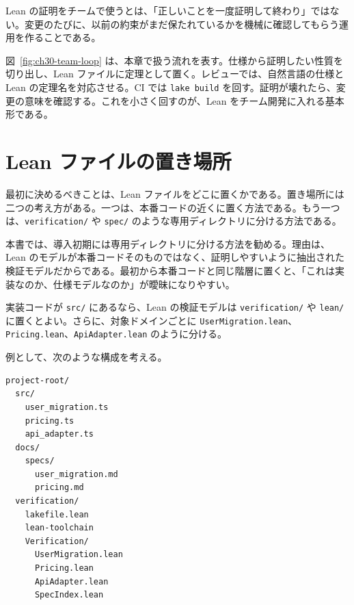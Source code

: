 \begin{intuitionbox}
Lean の証明をチームで使うとは、「正しいことを一度証明して終わり」ではない。変更のたびに、以前の約束がまだ保たれているかを機械に確認してもらう運用を作ることである。
\end{intuitionbox}


図~\ref{fig:ch30-team-loop} は、本章で扱う流れを表す。仕様から証明したい性質を切り出し、Lean ファイルに定理として置く。レビューでは、自然言語の仕様と Lean の定理名を対応させる。CI では \texttt{lake build} を回す。証明が壊れたら、変更の意味を確認する。これを小さく回すのが、Lean をチーム開発に入れる基本形である。

\section{Lean ファイルの置き場所}

最初に決めるべきことは、Lean ファイルをどこに置くかである。置き場所には二つの考え方がある。一つは、本番コードの近くに置く方法である。もう一つは、\texttt{verification/} や \texttt{spec/} のような専用ディレクトリに分ける方法である。

本書では、導入初期には専用ディレクトリに分ける方法を勧める。理由は、Lean のモデルが本番コードそのものではなく、証明しやすいように抽出された検証モデルだからである。最初から本番コードと同じ階層に置くと、「これは実装なのか、仕様モデルなのか」が曖昧になりやすい。

\begin{softwarebox}
実装コードが \texttt{src/} にあるなら、Lean の検証モデルは \texttt{verification/} や \texttt{lean/} に置くとよい。さらに、対象ドメインごとに \texttt{UserMigration.lean}、\texttt{Pricing.lean}、\texttt{ApiAdapter.lean} のように分ける。
\end{softwarebox}

例として、次のような構成を考える。

\begin{listing}[htbp]
\begin{verbatim}
project-root/
  src/
    user_migration.ts
    pricing.ts
    api_adapter.ts
  docs/
    specs/
      user_migration.md
      pricing.md
  verification/
    lakefile.lean
    lean-toolchain
    Verification/
      UserMigration.lean
      Pricing.lean
      ApiAdapter.lean
      SpecIndex.lean
\end{verbatim}
\caption{小さく始める Lean 検証ディレクトリの例}
\label{lst:ch30-directory-layout}
\end{listing}

